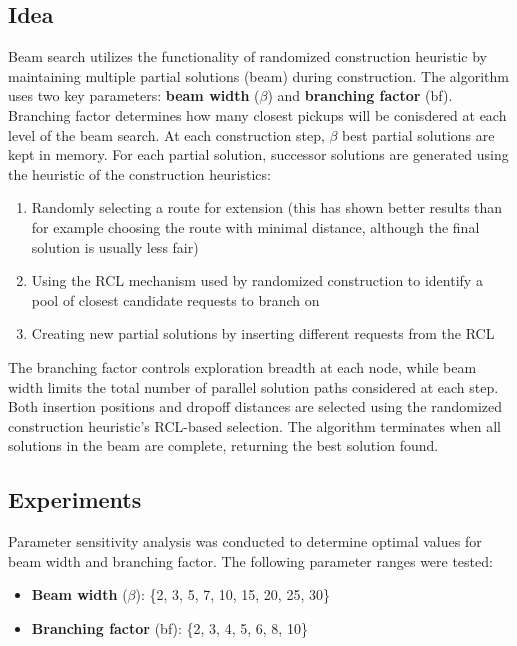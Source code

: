\documentclass[a4paper]{scrartcl}
\begin{document}
\subsection{Idea}
Beam search utilizes the functionality of randomized construction heuristic by maintaining multiple partial solutions (beam) during construction. The algorithm uses two key parameters: \textbf{beam width} ($\beta$) and \textbf{branching factor} (bf). Branching factor determines how many closest pickups will be conisdered at each level of the beam search. At each construction step, $\beta$ best partial solutions are kept in memory. For each partial solution, successor solutions are generated using the heuristic of the construction heuristics:
\begin{enumerate}
  \item Randomly selecting a route for extension (this has shown better results than for example choosing the route with minimal distance, although the final solution is usually less fair)
  \item Using the RCL mechanism used by randomized construction to identify a pool of closest candidate requests to branch on
  \item Creating new partial solutions by inserting different requests from the RCL
\end{enumerate}

The branching factor controls exploration breadth at each node, while beam width limits the total number of parallel solution paths considered at each step. Both insertion positions and dropoff distances are selected using the randomized construction heuristic's RCL-based selection. The algorithm terminates when all solutions in the beam are complete, returning the best solution found.
\textsc{}
\subsection{Experiments}
Parameter sensitivity analysis was conducted to determine optimal values for beam width and branching factor. The following parameter ranges were tested:
\begin{itemize}
  \item \textbf{Beam width} ($\beta$): \{2, 3, 5, 7, 10, 15, 20, 25, 30\}
  \item \textbf{Branching factor} (bf): \{2, 3, 4, 5, 6, 8, 10\}
\end{itemize}
\end{document}
